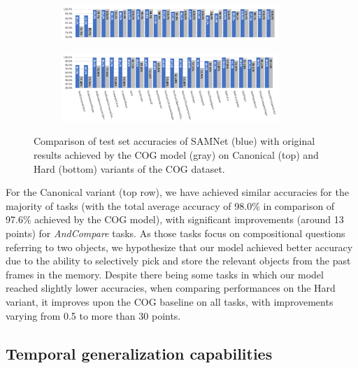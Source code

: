 \begin{figure}[htb]
	\centering
	\begin{subfigure}{\textwidth}
		\centering
		\includegraphics[width=0.9\textwidth]{img/results/samnet_cog_orig_canonical_no_labels.png}
	\end{subfigure}%
	\newline
	\begin{subfigure}{\textwidth}
		\centering
		\includegraphics[width=0.9\textwidth]{img/results/samnet_cog_orig_hard.png}
	\end{subfigure}%
	\caption{Comparison of test set accuracies of SAMNet (blue) with original results achieved by the COG model (gray) on Canonical (top) and Hard (bottom) variants of the COG dataset.}
	\label{fig:samnet_cog_detailed}
\end{figure}

For the Canonical variant (top row), we have achieved similar accuracies for the majority of tasks (with the total average accuracy of 98.0\% in comparison of 97.6\% achieved by the COG model), with significant improvements (around 13 points) for \textit{AndCompare} tasks.
As those tasks focus on compositional questions referring to two objects, we hypothesize that our model achieved better accuracy due to the ability to selectively pick and store the relevant objects from the past frames in the memory.
Despite there being some tasks in which our model reached slightly lower accuracies,
when comparing performances on the Hard variant, it improves upon the COG baseline on all tasks, with improvements varying from 0.5 to more than 30 points.

\subsection{Temporal generalization capabilities}

